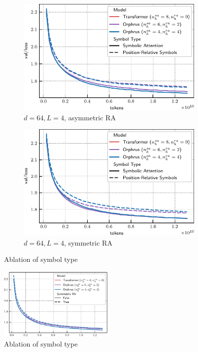 \begin{figure}
    \centering
    \begin{subfigure}{0.45\textwidth}
        \centering
        \includegraphics[width=\textwidth]{figs/experiments/tiny_stories/d64L4_ablation_symboltype_asymra.pdf}
        \caption{$d=64, L=4$, asymmetric RA}
    \end{subfigure}
    \begin{subfigure}{0.45\textwidth}
        \centering
        \includegraphics[width=\textwidth]{figs/experiments/tiny_stories/d64L4_ablation_symboltype_symra.pdf}
        \caption{$d=64, L=4$, symmetric RA}
    \end{subfigure}
    \caption{Ablation of symbol type}
\end{figure}

\begin{figure}
    \centering
    \includegraphics[width=0.5\textwidth]{figs/experiments/tiny_stories/d64L4_ablation_symmetry_symmattn.pdf}
    \caption{Ablation of symbol type}
\end{figure}

